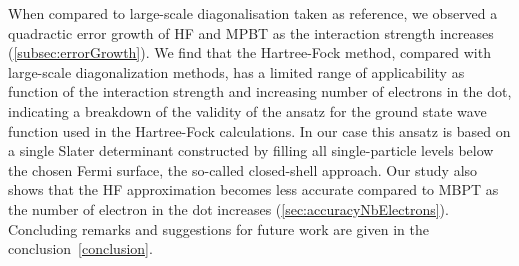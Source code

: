 When compared to large-scale diagonalisation taken as reference, we observed a quadractic error growth of HF and MPBT as the interaction strength increases (\ref{subsec:errorGrowth}).
We find that the Hartree-Fock method, compared with large-scale diagonalization methods, has a limited range of applicability as function of the interaction strength and increasing number of electrons in the dot, indicating a breakdown of the validity of the ansatz for the ground state wave function used in the Hartree-Fock calculations. In our case this ansatz is based on a single Slater determinant constructed
by filling all single-particle levels below the chosen Fermi surface, the so-called closed-shell approach.
Our study also shows that the HF approximation becomes less accurate compared to MBPT as the number of electron in the dot increases (\ref{sec:accuracyNbElectrons}).
Concluding remarks and suggestions for future work are given in the conclusion~\ref{conclusion}.
